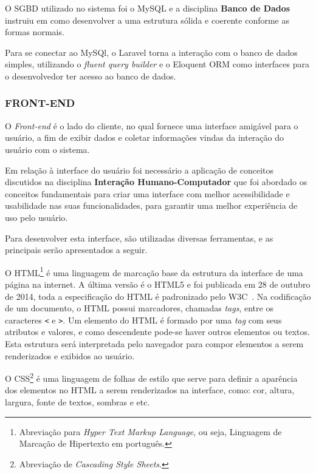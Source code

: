\documentclass[
  12pt,				%
  openany,
  oneside,
  a4paper,			%
  english,			%
  brazil
]{article}
\numberwithin{figure}{section}
\numberwithin{table}{section}
\newcounter{subsubsubsection}[subsubsection]
\begin{document}
O SGBD utilizado no sistema foi o MySQL e a disciplina \textbf{Banco de Dados} instruiu em como desenvolver a uma estrutura sólida e coerente conforme as formas normais.

Para se conectar ao MySQl, o Laravel torna a interação com o banco de dados simples, utilizando o \textit{fluent query builder} e o Eloquent ORM como interfaces para o desenvolvedor ter acesso ao banco de dados.





\subsubsection{FRONT-END}
O \textit{Front-end} é o lado do cliente, no qual fornece uma interface amigável para o usuário, a fim de exibir dados e coletar informações vindas da interação do usuário com o sistema.

Em relação à interface do usuário foi necessário a aplicação de conceitos discutidos na disciplina \textbf{Interação Humano-Computador} que foi abordado os conceitos fundamentais para criar uma interface com melhor acessibilidade e usabilidade nas suas funcionalidades, para garantir uma melhor experiência de uso pelo usuário.

Para desenvolver esta interface, são utilizadas diversas ferramentas, e as principais serão apresentados a seguir.


O HTML\footnote{Abreviação para \textit{Hyper Text Markup Language}, ou seja, Linguagem de Marcação de Hipertexto em português.} é uma linguagem de marcação base da estrutura da interface de uma página na internet. A última versão é o HTML5 e foi publicada em 28 de outubro de 2014, toda a especificação do HTML é padronizado pelo W3C~\cite{w3c}.
Na codificação de um documento, o HTML possui marcadores, chamadas \textit{tags}, entre os caracteres \texttt{<} e \texttt{>}. Um elemento do HTML é formado por uma \textit{tag} com seus atributos e valores, e como descendente pode-se haver outros elementos ou textos. Esta estrutura será interpretada pelo navegador para compor elementos a serem renderizados e exibidos ao usuário.




O CSS\footnote{Abreviação de \textit{Cascading Style Sheets}.} é uma linguagem de folhas de estilo que serve para definir a aparência dos elementos no HTML a serem renderizados na interface, como: cor, altura, largura, fonte de textos, sombras e etc.
\end{document}
